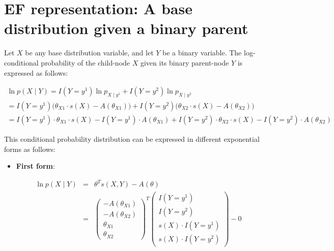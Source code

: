 \documentclass[11pt, oneside]{article}   	%
\numberwithin{figure}{section}
\numberwithin{equation}{section}
\numberwithin{table}{section}
\theoremstyle{definition}
\begin{document}
\begin{appendices}
\begin{itemize}
\end{itemize}

\newpage
\section{EF representation: A base distribution given a binary parent}

Let $X$ be any base distribution variable, and let $Y$ be a binary variable. The log-conditional probability of the child-node $X$ given its binary parent-node $Y$ is expressed as follows:

\begin{eqnarray*}
\ln p(X \mid Y) =  I(Y= y^1) \ln p_{X \mid y^1} + I(Y= y^2) \ln p_{X \mid y^2} ~~~~~~~~~~~~~~~~~~~~~~~~~~~~~~~~~~~~~~~~~~~~~~~~~~~~~\\
= I(Y= y^1)  \Big(\theta_{X1} \cdot s(X) - A(\theta_{X1})\Big) +  I(Y= y^2) \Big(\theta_{X2} \cdot s(X) - A(\theta_{X2})\Big) ~~~~~~~~~~~~~~~~~~~~~~~~~~~~\\
= I(Y=y^1) \cdot \theta_{X1} \cdot s(X) - I(Y=y^1) \cdot A(\theta_{X1}) +  I(Y=y^2) \cdot \theta_{X2} \cdot s(X) - I(Y=y^2) \cdot A(\theta_{X2})
\end{eqnarray*}

This conditional probability distribution can be expressed in different exponential forms as follows:

\begin{itemize}

\item \textbf{First form}:

\begin{eqnarray*}
\ln p(X \mid Y) &=& \theta^T s(X,Y) - A(\theta) \\
&=&
\begin{pmatrix}
- A(\theta_{X1}) \\
- A(\theta_{X2}) \\
\theta_{X1} \\
\theta_{X2}
\end{pmatrix}^T
\begin{pmatrix}
I(Y=y^1) \\
I(Y=y^2) \\
s(X) \cdot I(Y=y^1) \\
s(X) \cdot I(Y=y^2)
\end{pmatrix}
- 0 
\end{eqnarray*}


\end{itemize}
\end{appendices}
\end{document}
